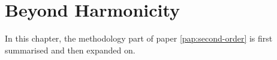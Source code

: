 \chapter{Beyond Harmonicity \pending}
\label{chap:erm}

In this chapter, the methodology part of paper \ref{pap:second-order} is first summarised and then expanded on.






